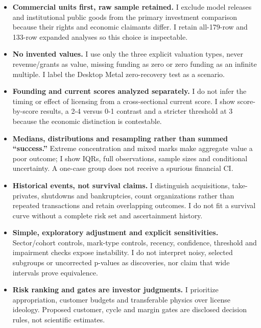 \begin{itemize}
\tightlist
\item
  \textbf{Commercial units first, raw sample retained.} I exclude model
  releases and institutional public goods from the primary investment
  comparison because their rights and economic claimants differ. I
  retain all-179-row and 133-row expanded analyses so this choice is
  inspectable.
\item
  \textbf{No invented values.} I use only the three explicit valuation
  types, never revenue/grants as value, missing funding as zero or zero
  funding as an infinite multiple. I label the Desktop Metal
  zero-recovery test as a scenario.
\item
  \textbf{Founding and current scores analyzed separately.} I do not
  infer the timing or effect of licensing from a cross-sectional current
  score. I show score-by-score results, a 2-4 versus 0-1 contrast and a
  stricter threshold at 3 because the economic distinction is
  contestable.
\item
  \textbf{Medians, distributions and resampling rather than summed
  ``success.''} Extreme concentration and mixed marks make aggregate
  value a poor outcome; I show IQRs, full observations, sample sizes and
  conditional uncertainty. A one-case group does not receive a spurious
  financial CI.
\item
  \textbf{Historical events, not survival claims.} I distinguish
  acquisitions, take-privates, shutdowns and bankruptcies, count
  organizations rather than repeated transactions and retain overlapping
  outcomes. I do not fit a survival curve without a complete risk set
  and ascertainment history.
\item
  \textbf{Simple, exploratory adjustment and explicit sensitivities.}
  Sector/cohort controls, mark-type controls, recency, confidence,
  threshold and impairment checks expose instability. I do not interpret
  noisy, selected subgroups or uncorrected p-values as discoveries, nor
  claim that wide intervals prove equivalence.
\item
  \textbf{Risk ranking and gates are investor judgments.} I prioritize
  appropriation, customer budgets and transferable physics over license
  ideology. Proposed customer, cycle and margin gates are disclosed
  decision rules, not scientific estimates.
\end{itemize}
